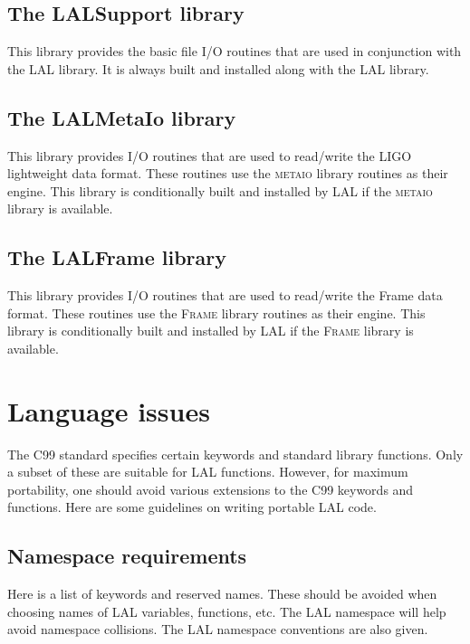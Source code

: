 \documentclass[10pt]{ligodcc}
\renewcommand{\texttt}[1]{{\ttfamily\color{blue}#1}}
\begin{document}
\subsection{The \texttt{LALSupport} library}

This library provides the basic file I/O routines that are used in conjunction
with the LAL library.  It is always built and installed along with the LAL
library.

\subsection{The \texttt{LALMetaIo} library}

This library provides I/O routines that are used to read/write the LIGO
lightweight data format.  These routines use the \textsc{metaio} library
routines as their engine.  This library is conditionally built and installed
by LAL if the \textsc{metaio} library is available.

\subsection{The \texttt{LALFrame} library}

This library provides I/O routines that are used to read/write the Frame
data format.  These routines use the \textsc{Frame} library
routines as their engine.  This library is conditionally built and installed
by LAL if the \textsc{Frame} library is available.

\appendix

\section{Language issues}
\label{a:language}

The C99 standard specifies certain keywords and standard library functions.
Only a subset of these are suitable for LAL functions.  However, for maximum
portability, one should avoid various extensions to the C99 keywords and
functions.  Here are some guidelines on writing portable LAL code.

\subsection{Namespace requirements}

Here is a list of keywords and reserved names.  These should be avoided
when choosing names of LAL variables, functions, etc.  The LAL namespace
will help avoid namespace collisions.  The LAL namespace conventions are
also given.
\end{document}

